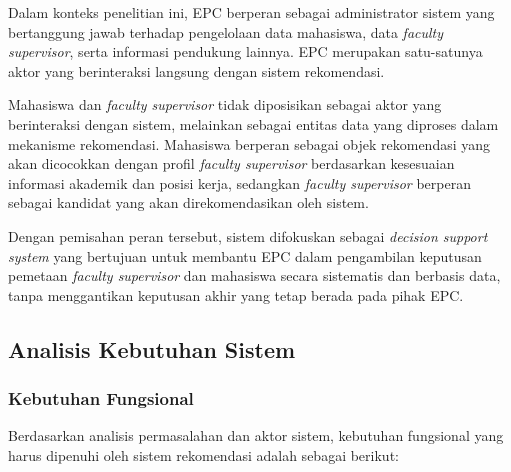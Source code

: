 Dalam konteks penelitian ini, EPC berperan sebagai administrator sistem yang bertanggung jawab terhadap pengelolaan data mahasiswa, data \textit{faculty supervisor}, serta informasi pendukung lainnya. EPC merupakan satu-satunya aktor yang berinteraksi langsung dengan sistem rekomendasi.

Mahasiswa dan \textit{faculty supervisor} tidak diposisikan sebagai aktor yang berinteraksi dengan sistem, melainkan sebagai entitas data yang diproses dalam mekanisme rekomendasi. Mahasiswa berperan sebagai objek rekomendasi yang akan dicocokkan dengan profil \textit{faculty supervisor} berdasarkan kesesuaian informasi akademik dan posisi kerja, sedangkan \textit{faculty supervisor} berperan sebagai kandidat yang akan direkomendasikan oleh sistem.

Dengan pemisahan peran tersebut, sistem difokuskan sebagai \textit{decision support system} yang bertujuan untuk membantu EPC dalam pengambilan keputusan pemetaan \textit{faculty supervisor} dan mahasiswa secara sistematis dan berbasis data, tanpa menggantikan keputusan akhir yang tetap berada pada pihak EPC.

\subsection{Analisis Kebutuhan Sistem}\label{analisis-kebutuhan-sistem}

\subsubsection{Kebutuhan Fungsional}\label{kebutuhan-fungsional}

Berdasarkan analisis permasalahan dan aktor sistem, kebutuhan fungsional yang harus dipenuhi oleh sistem rekomendasi adalah sebagai berikut:

